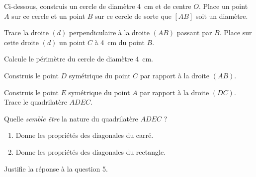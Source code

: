 \begin{myenumerate}
\item Ci-dessous, construis un cercle de diamètre 4~cm et de centre
  $O$. Place un point $A$ sur ce cercle et un point $B$ sur ce cercle
  de sorte que $[AB]$ soit un diamètre.\par Trace la droite $(d)$
  perpendiculaire à la droite $(AB)$ passant par $B$. Place sur cette
  droite $(d)$ un point $C$ à 4~cm du point $B$.
\item Calcule le périmètre du cercle de diamètre 4~cm.
\item Construis le point $D$ symétrique du point $C$ par rapport à la droite $(AB)$.
\item Construis le point $E$ symétrique du point $A$ par rapport à la droite $(DC)$. Trace le quadrilatère $ADEC$.
\item Quelle {\em semble être} la nature du quadrilatère $ADEC$ ?%
\item
  \begin{enumerate}
  \item Donne les propriétés des diagonales du carré.
  \item Donne les propriétés des diagonales du rectangle.
  \end{enumerate}
\item Justifie la réponse à la question 5.%
\end{myenumerate}